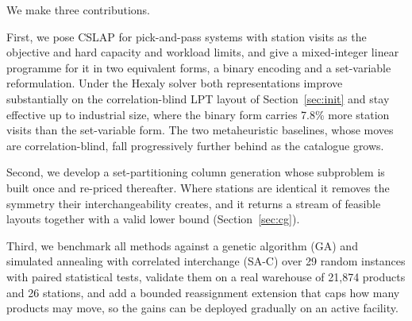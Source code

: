 \documentclass[]{interact}
\begin{document}
We make three contributions.

First, we pose CSLAP for pick-and-pass systems with station visits as the objective and hard capacity and workload limits, and give a mixed-integer linear programme for it in two equivalent forms, a binary encoding and a set-variable reformulation. Under the Hexaly solver both representations improve substantially on the correlation-blind LPT layout of Section~\ref{sec:init} and stay effective up to industrial size, where the binary form carries 7.8\% more station visits than the set-variable form. The two metaheuristic baselines, whose moves are correlation-blind, fall progressively further behind as the catalogue grows.

Second, we develop a set-partitioning column generation whose subproblem is built once and re-priced thereafter. Where stations are identical it removes the symmetry their interchangeability creates, and it returns a stream of feasible layouts together with a valid lower bound (Section~\ref{sec:cg}).

Third, we benchmark all methods against a genetic algorithm (GA) and simulated annealing with correlated interchange (SA-C) over 29 random instances with paired statistical tests, validate them on a real warehouse of 21,874 products and 26 stations, and add a bounded reassignment extension that caps how many products may move, so the gains can be deployed gradually on an active facility.

\end{document}

